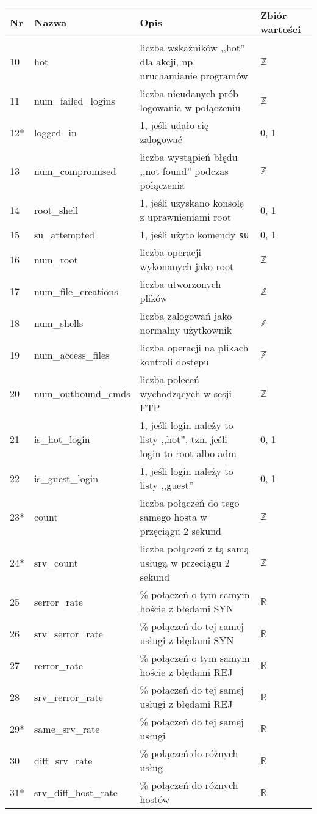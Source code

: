 \documentclass[a4paper, 12pt]{article}
\begin{document}
\begin{tabular}{ | l | l | p{} | p{} | } \hline
Nr & Nazwa & Opis & Zbiór wartości \\ \hline
10      & hot & liczba wskaźników ,,hot'' dla akcji, np. uruchamianie programów & $\mathbb{Z}$ \\ \hline
11      & num\_failed\_logins  & liczba nieudanych prób logowania w połączeniu & $\mathbb{Z}$ \\ \hline
12*      & logged\_in  & 1, jeśli udało się zalogować &  0, 1 \\ \hline
13      & num\_compromised & liczba wystąpień błędu ,,not found'' podczas połączenia &  $\mathbb{Z}$ \\ \hline
14      & root\_shell  & 1, jeśli uzyskano konsolę z uprawnieniami root  &  0, 1 \\ \hline
15      & su\_attempted  & 1, jeśli użyto komendy \texttt{su} &  0, 1 \\ \hline
16      & num\_root  & liczba operacji wykonanych jako root  & $\mathbb{Z}$ \\ \hline
17      & num\_file\_creations  & liczba utworzonych plików  & $\mathbb{Z}$ \\ \hline
18      & num\_shells  & liczba zalogowań jako normalny użytkownik & $\mathbb{Z}$ \\ \hline
19      & num\_access\_files  & liczba operacji na plikach kontroli dostępu & $\mathbb{Z}$ \\ \hline
20      & num\_outbound\_cmds & liczba poleceń wychodzących w sesji FTP & $\mathbb{Z}$ \\ \hline
21      & is\_hot\_login  & 1, jeśli login należy to listy ,,hot'', tzn. jeśli login to root albo adm &  0, 1 \\ \hline
22      & is\_guest\_login  & 1, jeśli login należy to listy ,,guest'' &  0, 1 \\ \hline
23*     & count & liczba połączeń do tego samego hosta w przęciągu 2 sekund & $\mathbb{Z}$ \\ \hline
24*      & srv\_count   & liczba połączeń z tą samą usługą w przeciągu 2 sekund &  $\mathbb{Z}$ \\ \hline
25      & serror\_rate        & \% połączeń o tym samym hoście z błędami SYN  & $\mathbb{R}$ \\ \hline
26      & srv\_serror\_rate   & \% połączeń do tej samej usługi z błędami SYN & $\mathbb{R}$ \\ \hline
27      & rerror\_rate        & \% połączeń o tym samym hoście z błędami REJ   & $\mathbb{R}$ \\ \hline
28      & srv\_rerror\_rate   & \% połączeń do tej samej usługi z błędami REJ  & $\mathbb{R}$ \\ \hline
29*      & same\_srv\_rate     & \% połączeń do tej samej usługi  &  $\mathbb{R}$ \\ \hline
30      & diff\_srv\_rate     & \% połączeń do różnych usług &  $\mathbb{R}$ \\ \hline  
31*      & srv\_diff\_host\_rate   & \% połączeń do różnych hostów   & $\mathbb{R}$ \\ \hline
\end{tabular}
\end{document}
